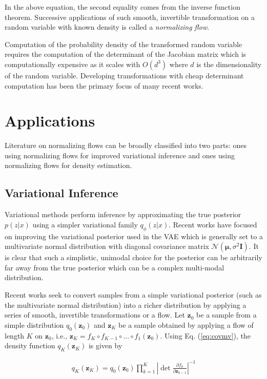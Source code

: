 \documentclass[runningheads]{llncs}
\begin{document}
In the above equation, the second equality comes from the inverse function theorem. Successive applications of such smooth, invertible transformation on a random variable with known density is called a \textit{normalizing flow}.

 Computation of the probability density of the transformed random variable requires the computation of the determinant of the Jacobian matrix which is computationally expensive as it scales with $O(d^3)$ where $d$ is the dimensionality of the random variable. Developing transformations with cheap determinant computation has been the primary focus of many recent works.
\section{Applications}
Literature on normalizing flows can be broadly classified into two parts: ones using normalizing flows for improved variational inference and ones using normalizing flows for density estimation.
\subsection{Variational Inference}
Variational methods perform inference by approximating the true posterior $p(z|x)$ using a simpler variational family $q_{\phi}(z|x)$. Recent works have focused on improving the variational posterior used in the VAE which is generally set to a multivariate normal distribution with diagonal covariance matrix $\mathcal{N}(\bm{\mu}, \sigma^2\mathbf{I})$. It is clear that such a simplistic, unimodal choice for the posterior can be arbitrarily far away from the true posterior which can be a complex multi-modal distribution. 

Recent works seek to convert samples from a simple variational posterior (such as the multivariate normal distribution) into a richer distribution by applying a series of smooth, invertible transformations or a flow. Let $\mathbf{z}_0$ be a sample from a simple distribution $q_0(\mathbf{z}_0)$ and $\mathbf{z}_K$ be a sample obtained by applying a flow of length $K$ on $\mathbf{z}_0$, i.e., $\mathbf{z}_K = f_K \circ f_{K-1} \circ \dots \circ f_1 (\mathbf{z}_0)$. Using Eq. (\ref{eq:covmv}), the density function $q_K(\mathbf{z}_K)$ is given by

\begin{align}
q_K(\mathbf{z}_K) = q_0(\mathbf{z}_0)\prod_{k=1}^K\left|\det \frac{\partial f_k}{\partial \mathbf{z}_{k-1}}\right|^{-1}\label{eq:qzk}
\end{align}
\end{document}

